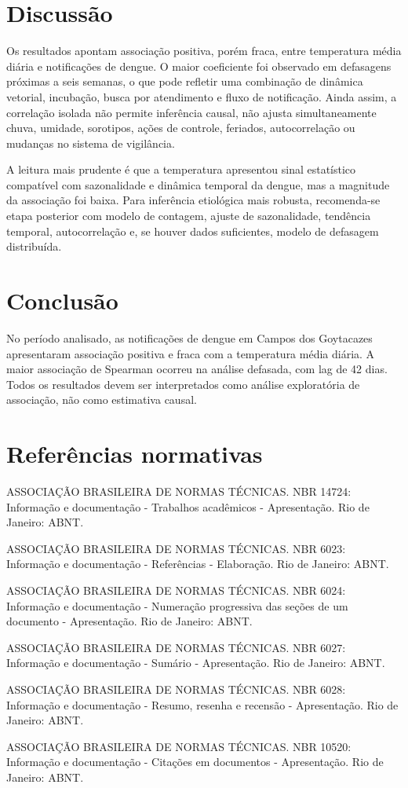 \documentclass[
  12pt,
]{article}
\begin{document}
\section{Discussão}\label{discussuxe3o}

Os resultados apontam associação positiva, porém fraca, entre
temperatura média diária e notificações de dengue. O maior coeficiente
foi observado em defasagens próximas a seis semanas, o que pode refletir
uma combinação de dinâmica vetorial, incubação, busca por atendimento e
fluxo de notificação. Ainda assim, a correlação isolada não permite
inferência causal, não ajusta simultaneamente chuva, umidade, sorotipos,
ações de controle, feriados, autocorrelação ou mudanças no sistema de
vigilância.

A leitura mais prudente é que a temperatura apresentou sinal estatístico
compatível com sazonalidade e dinâmica temporal da dengue, mas a
magnitude da associação foi baixa. Para inferência etiológica mais
robusta, recomenda-se etapa posterior com modelo de contagem, ajuste de
sazonalidade, tendência temporal, autocorrelação e, se houver dados
suficientes, modelo de defasagem distribuída.

\section{Conclusão}\label{conclusuxe3o}

No período analisado, as notificações de dengue em Campos dos Goytacazes
apresentaram associação positiva e fraca com a temperatura média diária.
A maior associação de Spearman ocorreu na análise defasada, com lag de
42 dias. Todos os resultados devem ser interpretados como análise
exploratória de associação, não como estimativa causal.

\section{Referências normativas}\label{referuxeancias-normativas}

ASSOCIAÇÃO BRASILEIRA DE NORMAS TÉCNICAS. NBR 14724: Informação e
documentação - Trabalhos acadêmicos - Apresentação. Rio de Janeiro:
ABNT.

ASSOCIAÇÃO BRASILEIRA DE NORMAS TÉCNICAS. NBR 6023: Informação e
documentação - Referências - Elaboração. Rio de Janeiro: ABNT.

ASSOCIAÇÃO BRASILEIRA DE NORMAS TÉCNICAS. NBR 6024: Informação e
documentação - Numeração progressiva das seções de um documento -
Apresentação. Rio de Janeiro: ABNT.

ASSOCIAÇÃO BRASILEIRA DE NORMAS TÉCNICAS. NBR 6027: Informação e
documentação - Sumário - Apresentação. Rio de Janeiro: ABNT.

ASSOCIAÇÃO BRASILEIRA DE NORMAS TÉCNICAS. NBR 6028: Informação e
documentação - Resumo, resenha e recensão - Apresentação. Rio de
Janeiro: ABNT.

ASSOCIAÇÃO BRASILEIRA DE NORMAS TÉCNICAS. NBR 10520: Informação e
documentação - Citações em documentos - Apresentação. Rio de Janeiro:
ABNT.
\end{document}
